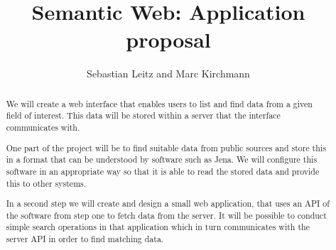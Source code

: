 \documentclass{llncs}
\begin{document}
\title{Semantic Web: Application proposal}

\author{
Sebastian Leitz and Marc Kirchmann}

\maketitle

\begin{abstract}
We will create a web interface that enables users to list and find data from a given field of interest. This data will be stored within a server that the interface communicates with.

One part of the project will be to find suitable data from public sources and store this in a format that can be understood by software such as Jena. We will configure this software in an appropriate way so that it is able to read the stored data and provide this to other systems.

In a second step we will create and design a small web application, that uses an API of the software from step one to fetch data from the server. It will be possible to conduct simple search operations in that application which in turn communicates with the server API in order to find matching data.
\end{abstract}



\end{document}
